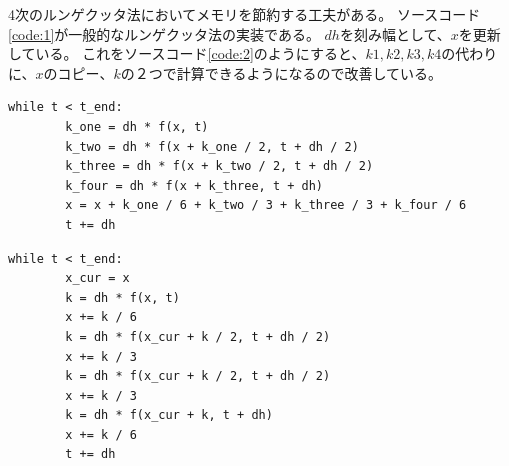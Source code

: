 \documentclass{jsarticle}
\begin{document}
4次のルンゲクッタ法においてメモリを節約する工夫がある。
ソースコード\ref{code:1}が一般的なルンゲクッタ法の実装である。
$dh$を刻み幅として、$x$を更新している。
これをソースコード\ref{code:2}のようにすると、$k1,k2,k3,k4$の代わりに、$x$のコピー、$k$の２つで計算できるようになるので改善している。
\begin{lstlisting}[caption=通常の4次のルンゲクッタ,label={code:1}]
    while t < t_end:
        k_one = dh * f(x, t)
        k_two = dh * f(x + k_one / 2, t + dh / 2)
        k_three = dh * f(x + k_two / 2, t + dh / 2)
        k_four = dh * f(x + k_three, t + dh)
        x = x + k_one / 6 + k_two / 3 + k_three / 3 + k_four / 6
        t += dh

\end{lstlisting}
\begin{lstlisting}[caption=メモリを節約する4次のルンゲクッタ,label={code:2}]
    while t < t_end:
        x_cur = x
        k = dh * f(x, t)
        x += k / 6
        k = dh * f(x_cur + k / 2, t + dh / 2)
        x += k / 3
        k = dh * f(x_cur + k / 2, t + dh / 2)
        x += k / 3
        k = dh * f(x_cur + k, t + dh)
        x += k / 6
        t += dh

\end{lstlisting}
\end{document}
